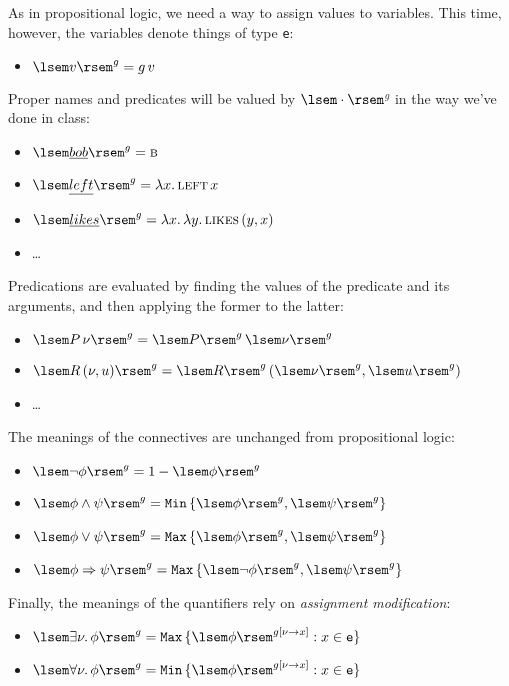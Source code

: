 \documentclass{article}
\newcommand{\sv}[1]{\ensuremath{\lsem #1 \rsem}}
\newcommand{\set}[1]{\ensuremath{\{#1\}}}
\newcommand{\Ra}{\Rightarrow}
\newcommand{\ra}{\rightarrow}
\newcommand{\con}[1]{\textsc{\textsf{#1}}}
\begin{document}
As in propositional logic, we need a way to assign values to variables. This
time, however, the variables denote things of type \texttt{e}:
\begin{itemize}
  \item
    $\sv{v}^g = g\,v$
\end{itemize}

Proper names and predicates will be valued by \sv{\cdot}$^g$ in the way we've
done in class:
\begin{itemize}
  \item
    $\sv{\emph{bob}}^g = \con{b}$

  \item
    $\sv{\emph{left}}^g = \lambda x.\,\con{left}\,x$

  \item
    $\sv{\emph{likes}}^g = \lambda x.\,\lambda y.\,\con{likes}\,(y,x)$
    
  \item
    \dots
\end{itemize}

Predications are evaluated by finding the values of the predicate and its
arguments, and then applying the former to the latter:
\begin{itemize}
  \item
    $\sv{P\,\nu}^g = \sv{P}^g\,\sv{\nu}^g$

  \item
    $\sv{R\,(\nu, u )}^g = \sv{R}^g\,(\sv{\nu}^g, \sv{u }^g)$

  \item
    \dots
\end{itemize}

The meanings of the connectives are unchanged from propositional logic:
\begin{itemize}
  \item
    $\sv{\neg\phi}^g = 1 - \sv{\phi}^g$

  \item
    $\sv{\phi \wedge \psi}^g = \texttt{Min}\,\set{\sv{\phi}^g, \sv{\psi}^g}$

  \item
    $\sv{\phi \vee \psi}^g = \texttt{Max}\,\set{\sv{\phi}^g, \sv{\psi}^g}$

  \item
    $\sv{\phi \Ra \psi}^g = \texttt{Max}\,\set{\sv{\neg\phi}^g, \sv{\psi}^g}$
\end{itemize}

Finally, the meanings of the quantifiers rely on \emph{assignment modification}:
\begin{itemize}
  \item
    $\sv{\exists \nu.\, \phi}^g = \texttt{Max}\,\set{\sv{\phi}^{g[\nu \ra x]} :
    x \in \texttt{e}}$

  \item
    $\sv{\forall \nu.\, \phi}^g = \texttt{Min}\,\set{\sv{\phi}^{g[\nu \ra x]} :
    x \in \texttt{e}}$
\end{itemize}
\end{document}
